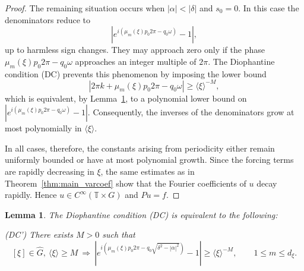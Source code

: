 \documentclass[11pt,reqno]{amsart}
\numberwithin{equation}{section}
\newtheorem{lemma}[theorem]{Lemma}
\begin{document}
\begin{proof}
		The remaining situation occurs when $|\alpha|<|\delta|$ and $s_0=0$.
		In this case the denominators reduce to
		\[
		|e^{i(\mu_m(\xi)p_0 2\pi-q_0\omega)}-1|,
		\]
		up to harmless sign changes.
		They may approach zero only if the phase
		$\mu_m(\xi)p_0 2\pi-q_0\omega$
		approaches an integer multiple of $2\pi$.
		The Diophantine condition (DC) prevents this phenomenon
		by imposing the lower bound
		\[
		|2\pi k+\mu_m(\xi)p_0 2\pi-q_0\omega|
		\ge \langle\xi\rangle^{-M},
		\]
		which is equivalent, by Lemma~\ref{lem:dc_equiv},
		to a polynomial lower bound on
		$|e^{i(\mu_m(\xi)p_0 2\pi-q_0\omega)}-1|$.
		Consequently, the inverses of the denominators grow at most
		polynomially in $\langle\xi\rangle$.
		
		In all cases, therefore, the constants arising from periodicity
		either remain uniformly bounded or have at most polynomial growth.
		Since the forcing terms are rapidly decreasing in $\xi$,
		the same estimates as in Theorem~\ref{thm:main_varcoef}
		show that the Fourier coefficients of $u$
		decay rapidly.
		Hence $u\in C^\infty(\mathbb{T}\times G)$ and $Pu=f$.
	\end{proof}
	
	
	
	\begin{lemma}\label{lem:dc_equiv}
		The Diophantine condition \textup{(DC)} is equivalent to the following:
		\medskip\noindent
		
		\textup{(DC')} There exists $M > 0$ such that
		\[
		[\xi] \in \widehat{G},\ \langle\xi\rangle \ge M
		\ \Longrightarrow\
		\left|e^{i(\mu_m(\xi)p_0 2\pi - q_0\sqrt{\delta^2 - |\alpha|^2})} - 1\right|
		\ge \langle\xi\rangle^{-M},
		\qquad 1 \le m \le d_\xi.
		\]
	\end{lemma}
	
\end{document}
